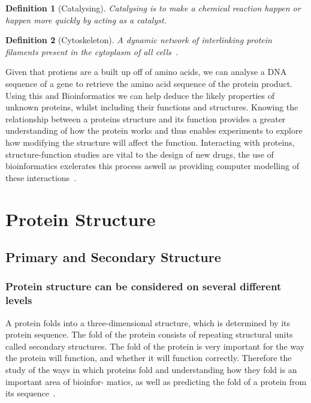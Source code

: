 \documentclass{report}
\newtheorem{definition}{Definition}[section]
\begin{document}
\begin{definition}[Catalysing]
    Catalysing is to make a chemical reaction happen or happen more quickly by acting as a catalyst.
\end{definition}

\begin{definition}[Cytoskeleton]
    A dynamic network of interlinking protein filaments present in the cytoplasm of all cells~\cite{zvelebil_understanding_2008}. 
\end{definition}

Given that protiens are a built up off of amino acids, we can analyse a DNA sequence of a gene to retrieve the amino acid sequence of the protein product. Using this and Bioinformatics we can help deduce the likely properties of unknown proteins, whilst including their functions and structures. Knowing the relationship between a proteins structure and its function provides a greater understanding of how the protein works and thus enables experiments to explore how modifying the structure will affect the function. Interacting with proteins, structure-function studies are vital to the design of new drugs, the use of bioinformatics exelerates this process aswell as providing computer modelling of these interactions~\cite{zvelebil_understanding_2008}.

\section{Protein Structure}

\subsection{Primary and Secondary Structure}

\subsubsection{Protein structure can be considered on several different levels}

A protein folds into a three-dimensional structure, which is determined by its protein sequence. The fold of the protein consists of repeating structural units called secondary structures. The fold of the protein is very important for the way the protein will function, and whether it will function correctly. Therefore the study of the ways in which proteins fold and understanding how they fold is an important area of bioinfor- matics, as well as predicting the fold of a protein from its sequence~\cite{zvelebil_understanding_2008}.
\end{document}
